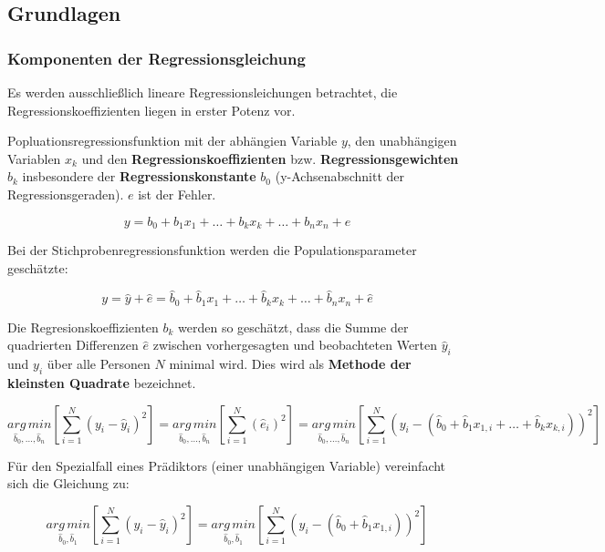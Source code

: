 \documentclass{article}
\numberwithin{equation}{section}
\begin{document}
\subsection{Grundlagen}
\label{sec:grund-reg}

\subsubsection{Komponenten der Regressionsgleichung}
\label{sec:komp-reg}

Es werden ausschließlich lineare Regressionsleichungen betrachtet, die Regressionskoeffizienten liegen in erster Potenz vor.

Popluationsregressionsfunktion mit der abhängien Variable $y$, den unabhängigen Variablen $x_k$ und den \textbf{Regressionskoeffizienten} bzw. \textbf{Regressionsgewichten} $b_k$ insbesondere der \textbf{Regressionskonstante} $b_0$ (y-Achsenabschnitt der Regressionsgeraden). $e$ ist der Fehler.

\begin{equation}
y = b_0 + b_1 x_1 + \dots + b_k x_k + \dots + b_n x_n + e
\label{eq:lin-regression}
\end{equation}

Bei der Stichprobenregressionsfunktion werden die Populationsparameter geschätzte:

\begin{equation}
y = \hat y + \hat e = \hat b_0 + \hat b_1 x_1 + \dots + \hat b_k x_k + \dots + \hat b_n x_n + \hat e
\end{equation}

Die Regresionskoeffizienten $b_k$ werden so geschätzt, dass die Summe der quadrierten Differenzen $\hat e$ zwischen vorhergesagten und beobachteten Werten $\hat y_i$ und $y_i$ über alle Personen $N$ minimal wird. Dies wird als \textbf{Methode der kleinsten Quadrate} bezeichnet.

\begin{equation}
\underset{\hat b_0, \dots, \hat b_n}{arg\,min} \left[ \sum_{i=1}^N (y_i - \hat y_i)^2 \right] = \underset{\hat b_0, \dots, \hat b_n}{arg\,min} \left[ \sum_{i=1}^N (\hat e_i)^2 \right] = \underset{\hat b_0, \dots, \hat b_n}{arg\,min} \left[ \sum_{i=1}^N (y_i - (\hat b_0 + \hat b_1 x_{1,i} + \dots + \hat b_k x_{k,i}))^2 \right]
\end{equation}

Für den Spezialfall eines Prädiktors (einer unabhängigen Variable) vereinfacht sich die Gleichung zu:

\begin{equation}
\label{eq:lineares-modell-2prae}
\underset{\hat b_0, \hat b_1}{arg\,min} \left[ \sum_{i=1}^N (y_i - \hat y_i)^2 \right] = \underset{\hat b_0, \hat b_1}{arg\,min} \left[ \sum_{i=1}^N (y_i - (\hat b_0 + \hat b_1 x_{1,i}))^2 \right]
\end{equation}
\end{document}
